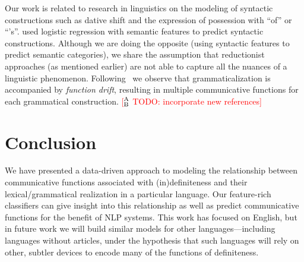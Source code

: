 \documentclass[11pt,letterpaper]{article}
\newcommand{\ensuretext}[1]{#1}
\newcommand{\abmarker}{\ensuretext{\textcolor{red}{\ensuremath{^{\textsc{A}}_{\textsc{B}}}}}}
\newcommand{\arkcomment}[3]{\ensuretext{\textcolor{#3}{[#1 #2]}}}
\newcommand{\ab}[1]{\arkcomment{\abmarker}{#1}{red}}
\begin{document}
Our work is related to research in linguistics on the modeling of syntactic constructions 
such as dative shift and the expression of possession with ``of'' or ``'s''.  
\citet{bresnan10} used logistic regression with semantic features to predict syntactic constructions.   
Although we are doing the opposite (using syntactic features to predict semantic categories), 
we share the assumption that reductionist approaches (as mentioned earlier) are not able to capture all the nuances of a linguistic phenomenon. 
Following~\citet{hopper-03} we observe that grammaticalization is accompanied by {\em function drift}, 
resulting in multiple communicative functions for each grammatical construction. 
\ab{TODO: incorporate new references}



\section{Conclusion}\label{sec:conclusion}

We have presented a data-driven approach to modeling the relationship between 
communicative functions associated with (in)definiteness and their lexical\slash grammatical realization in a particular language.
Our feature-rich classifiers can give insight into this relationship
as well as predict communicative functions for the benefit of NLP systems.
This work has focused on English, but in future work we will build similar models for other languages---including 
languages without articles, under the hypothesis that such languages will rely on other, subtler devices to encode
many of the functions of definiteness.





\setlength{\bibsep}{10pt}
{\fontsize{10}{12.25}\selectfont
}
\end{document}
